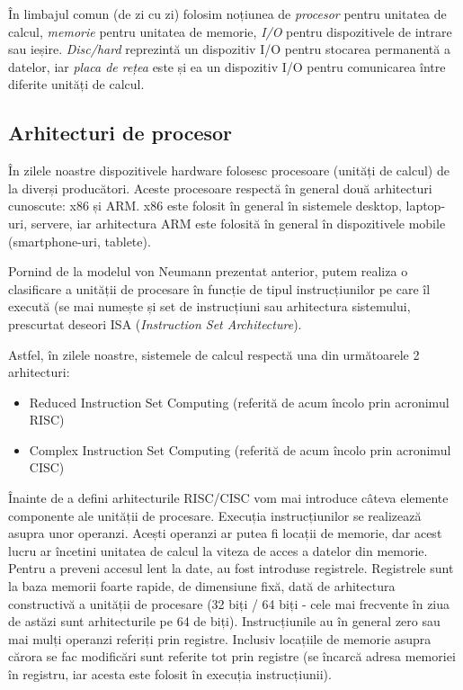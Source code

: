 În limbajul comun (de zi cu zi) folosim noțiunea de \textit{procesor} pentru
unitatea de calcul, \textit{memorie} pentru unitatea de memorie, \textit{I/O}
pentru dispozitivele de intrare sau ieșire. \textit{Disc/hard} reprezintă un
dispozitiv I/O pentru stocarea permanentă a datelor, iar \textit{placa de rețea}
este și ea un dispozitiv I/O pentru comunicarea între diferite unități de
calcul.

\subsection{Arhitecturi de procesor}
\label{sec:hw:class:cpu}

În zilele noastre dispozitivele hardware folosesc procesoare (unități de calcul)
de la diverși producători. Aceste procesoare respectă în general două
arhitecturi cunoscute: x86 și ARM. x86 este folosit în general în sistemele
desktop, laptop-uri, servere, iar arhitectura ARM este folosită în general în
dispozitivele mobile (smartphone-uri, tablete).

Pornind de la modelul von Neumann prezentat anterior, putem realiza o
clasificare a unității de procesare în funcție de tipul instrucțiunilor pe care
îl execută (se mai numește și set de instrucțiuni sau arhitectura sistemului,
prescurtat deseori ISA (\textit{Instruction
Set Architecture}).

Astfel, în zilele noastre, sistemele de calcul respectă una din următoarele 2
arhitecturi:

\begin{itemize}
  \item Reduced Instruction Set Computing (referită de acum încolo prin
    acronimul RISC) 
  \item Complex Instruction Set Computing (referită de acum încolo prin
    acronimul CISC) 
\end{itemize}

Înainte de a defini arhitecturile RISC/CISC vom mai introduce câteva elemente
componente ale unității de procesare. Execuția instrucțiunilor se realizează
asupra unor operanzi. Acești operanzi ar putea fi locații de memorie, dar acest
lucru ar încetini unitatea de calcul la viteza de acces a datelor din memorie.
Pentru a preveni accesul lent la date, au fost introduse registrele. Registrele
sunt la baza memorii foarte rapide, de dimensiune fixă, dată de arhitectura
constructivă a unității de procesare (32 biți / 64 biți - cele mai frecvente în ziua
de astăzi sunt arhitecturile pe 64 de biți). Instrucțiunile au în general zero
sau mai mulți operanzi referiți prin registre. Inclusiv locațiile de memorie
asupra cărora se fac modificări sunt referite tot prin registre (se încarcă
adresa memoriei în registru, iar acesta este folosit în execuția instrucțiunii).

